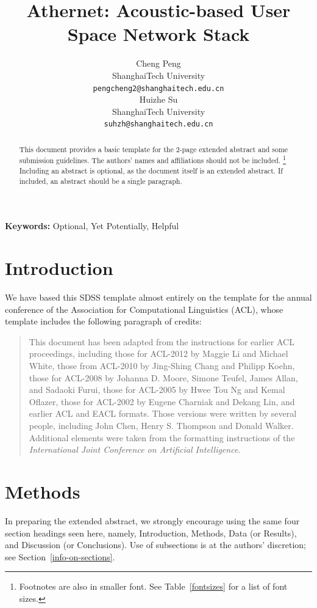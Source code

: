 \documentclass[10pt]{article}
\title{Athernet: Acoustic-based User Space Network Stack}
\author{
  Cheng Peng \\
   ShanghaiTech University   \\
  {\tt pengcheng2@shanghaitech.edu.cn} \\\And
 Huizhe Su \\
   ShanghaiTech University  \\
  {\tt suhzh@shanghaitech.edu.cn} \\}
\date{}
\begin{document}
\maketitle
\begin{abstract}
  This document provides a basic template for the 2-page extended abstract
  and some submission guidelines. The authors' names and affiliations should not be included. \footnote{Footnotes are also in smaller font.
    See Table~\ref{fontsizes} for a list of font sizes.}
  Including an abstract is optional, as the document itself is an extended abstract.
  If included, an abstract should be a single paragraph.
\end{abstract}

{\bf Keywords:} Optional, Yet Potentially, Helpful

\section{Introduction}

We have based this SDSS template almost entirely on the template for
the annual conference of the Association for Computational Linguistics (ACL), whose
template includes the following paragraph of credits:
\begin{quotation}
  \small %
  This document has been adapted from the instructions for earlier ACL
  proceedings, including those for ACL-2012 by Maggie Li and Michael
  White, those from ACL-2010 by Jing-Shing Chang and Philipp Koehn,
  those for ACL-2008 by Johanna D. Moore, Simone Teufel, James Allan,
  and Sadaoki Furui, those for ACL-2005 by Hwee Tou Ng and Kemal
  Oflazer, those for ACL-2002 by Eugene Charniak and Dekang Lin, and
  earlier ACL and EACL formats. Those versions were written by several
  people, including John Chen, Henry S. Thompson and Donald
  Walker. Additional elements were taken from the formatting
  instructions of the {\em International Joint Conference on Artificial
      Intelligence}.
\end{quotation}

\section{Methods}

In preparing the extended abstract,
we strongly encourage using the same four section headings seen here, namely,
Introduction, Methods, Data (or Results), and Discussion (or Conclusions).
Use of subsections is at the authors' discretion; see Section~\ref{info-on-sections}.
\end{document}
